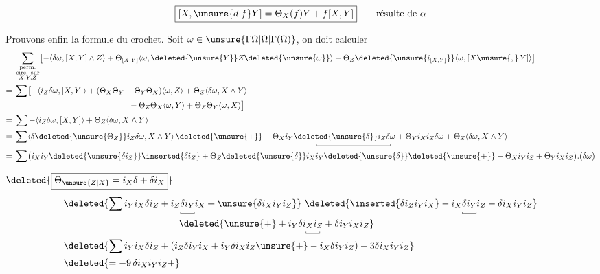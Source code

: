 \[
\boxed{[X,\unsure{d|f}Y]=\Theta_X(f)Y+f[X,Y]}\qquad\text{résulte de }\alpha
\]

Prouvons enfin la formule du crochet. Soit $\omega\in\unsure{\Gamma\Omega|\Omega|\Gamma(\Omega)}$, on doit  calculer
\[
\begin{aligned}
&\sum_{\substack{\text{perm.}\\\text{circ. sur}\\X,Y,Z}}
\bigl[-\langle\delta\omega,[X,Y]\wedge Z\rangle+\Theta_{[X,Y]}\langle\omega,\deleted{\unsure{Y}}Z\deleted{\unsure{\omega}}\rangle-\Theta_Z\deleted{\unsure{i_{[X,Y]}}}\langle\omega,[X\unsure{,}\,Y]\rangle\bigr]\\
={}&\sum\bigl[-\langle i_Z\delta\omega,[X,Y]\rangle+(\Theta_X\Theta_Y-\Theta_Y\Theta_X)\langle\omega,Z\rangle+\Theta_Z\langle\delta\omega,X\wedge Y\rangle\\
&\hspace{14em}-\Theta_Z\Theta_X\langle\omega,Y\rangle+\Theta_Z\Theta_Y\langle\omega,X\rangle\bigr]\\
={}&\sum-\langle i_Z\delta\omega,[X,Y]\rangle+\Theta_Z\langle\delta\omega,X\wedge Y\rangle\\
={}&\sum\langle\delta\deleted{\unsure{\Theta_Z}}i_Z\delta\omega,X\wedge Y\rangle\,
\deleted{\unsure{+}}-\underset{\smash{\rule{.35pt}{2pt}\rule{9em}{.35pt}\rule{.35pt}{2pt}}}{\Theta_X i_Y\deleted{\unsure{\delta}}i_Z\delta\omega+\Theta_Y i_X i_Z}\delta\omega+\Theta_Z\langle\delta\omega,X\wedge Y\rangle\\
={}&\sum\bigl(i_X i_Y\deleted{\unsure{\delta i_Z}}\inserted{\delta i_Z}+\Theta_Z\deleted{\unsure{\delta}}i_X i_Y\deleted{\unsure{\delta}}\deleted{\unsure{+}}-\Theta_X i_Y i_Z+\Theta_Y i_X i_Z\bigr).(\delta\omega)
\end{aligned}
\]

 $\deleted{\boxed{\Theta_{\unsure{Z|X}}=i_X\delta+\delta i_X}}$  
\[
\begin{aligned}
&\deleted{\sum i_Y i_X\delta i_Z+i_Z\underset{\smash{\rule{.35pt}{2pt}\rule{1.4em}{.35pt}\rule{.35pt}{2pt}}}{\delta i_Y}i_X+\unsure{\delta i_X i_Y i_Z}}\
\deleted{\inserted{\delta i_Z i_Y i_X}-i_X\underset{\smash{\rule{.35pt}{2pt}\rule{1.4em}{.35pt}\rule{.35pt}{2pt}}}{\delta i_Y}i_Z-\delta i_X i_Y i_Z}\\
&\hspace{12em}\deleted{\unsure{+}+i_Y\delta\underset{\smash{\rule{.35pt}{2pt}\rule{1.4em}{.35pt}\rule{.35pt}{2pt}}}{i_X i_Z}+\delta i_Y i_X i_Z}\\
&\deleted{\sum i_Y i_X\delta i_Z+(i_Z\delta i_Y i_X+i_Y\delta i_X i_Z\unsure{+}-i_X\delta i_Y i_Z)-3\delta i_X i_Y i_Z}\\
&\deleted{=-9\,\delta i_X i_Y i_Z+}
\end{aligned}
\]

